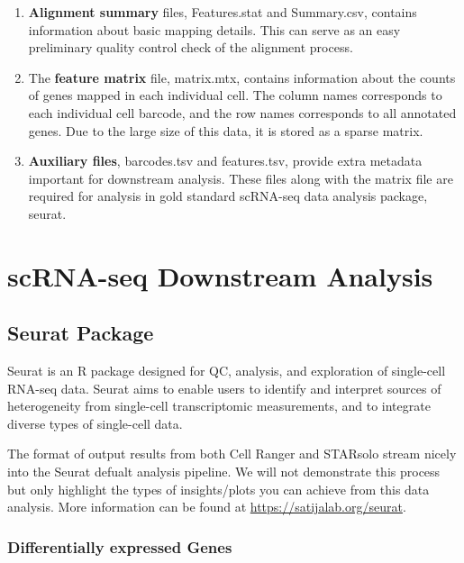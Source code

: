 \documentclass[]{book}
\begin{document}
\begin{enumerate}
\def\labelenumi{\arabic{enumi}.}
\setcounter{enumi}{1}
\item
  \textbf{Alignment summary} files, Features.stat and Summary.csv, contains information about basic mapping details. This can serve as an easy preliminary quality control check of the alignment process.
\item
  The \textbf{feature matrix} file, matrix.mtx, contains information about the counts of genes mapped in each individual cell. The column names corresponds to each individual cell barcode, and the row names corresponds to all annotated genes. Due to the large size of this data, it is stored as a sparse matrix.
\item
  \textbf{Auxiliary files}, barcodes.tsv and features.tsv, provide extra metadata important for downstream analysis. These files along with the matrix file are required for analysis in gold standard scRNA-seq data analysis package, seurat.
\end{enumerate}

\hypertarget{scrna-seq-downstream-analysis}{%
\chapter{scRNA-seq Downstream Analysis}\label{scrna-seq-downstream-analysis}}

\hypertarget{seurat-package}{%
\section{Seurat Package}\label{seurat-package}}

Seurat is an R package designed for QC, analysis, and exploration of single-cell RNA-seq data. Seurat aims to enable users to identify and interpret sources of heterogeneity from single-cell transcriptomic measurements, and to integrate diverse types of single-cell data.

The format of output results from both Cell Ranger and STARsolo stream nicely into the Seurat defualt analysis pipeline. We will not demonstrate this process but only highlight the types of insights/plots you can achieve from this data analysis. More information can be found at \url{https://satijalab.org/seurat}.

\hypertarget{differentially-expressed-genes}{%
\subsection{Differentially expressed Genes}\label{differentially-expressed-genes}}
\end{document}
